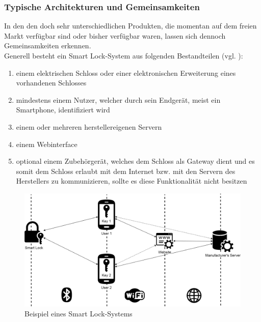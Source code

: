 	\subsubsection{Typische Architekturen und Gemeinsamkeiten}
	\label{sec:sota_smart_locks_arch}
	    In den den doch sehr unterschiedlichen Produkten, die momentan auf dem freien Markt verfügbar sind oder bisher verfügbar waren, lassen sich dennoch Gemeinsamkeiten erkennen\cite{Ye2017,Fuller2017}. 
	    \medskip\\
    	Generell besteht ein Smart Lock-System aus folgenden Bestandteilen (vgl. ):
    	\begin{enumerate}[noitemsep]
    		\item einem elektrischen Schloss oder einer elektronischen Erweiterung eines vorhandenen Schlosses
    		\item mindestens einem Nutzer, welcher durch sein Endgerät, meist ein Smartphone, identifiziert wird
    		\item einem oder mehreren herstellereigenen Servern
    		\item einem Webinterface
    		\item optional einem Zubehörgerät, welches dem Schloss als Gateway dient und es somit dem Schloss erlaubt mit dem Internet bzw. mit den Servern des Herstellers zu kommunizieren, sollte es diese Funktionalität nicht besitzen
    	\end{enumerate}
    	\newpage
    	\begin{figure}[H]
			\centering
			\includegraphics[width=\textwidth]{graphics/sl_arch.png}
			\caption[Beispiel eines Smart Lock-Systems]{Beispiel eines Smart Lock-Systems}
			\label{fig:sl_arch}
		\end{figure}
    	
